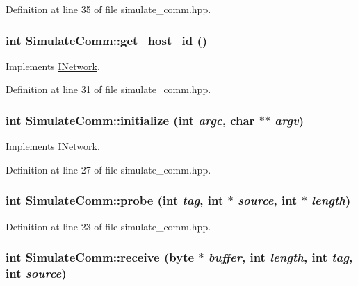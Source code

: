 Definition at line 35 of file simulate\_\-comm.hpp.\hypertarget{class_simulate_comm_a0cc18f43f08d707c300466e9e1a59184}{
\subsubsection[{get\_\-host\_\-id}]{\setlength{\rightskip}{0pt plus 5cm}int SimulateComm::get\_\-host\_\-id ()}}
\label{class_simulate_comm_a0cc18f43f08d707c300466e9e1a59184}


Implements \hyperlink{class_i_network_aef01bb260a8e60c7c9085b381cf86f13}{INetwork}.

Definition at line 31 of file simulate\_\-comm.hpp.\hypertarget{class_simulate_comm_a7086d3778f9c2d01d0425c4d940a57d1}{
\subsubsection[{initialize}]{\setlength{\rightskip}{0pt plus 5cm}int SimulateComm::initialize (int {\em argc}, \/  char $\ast$$\ast$ {\em argv})}}
\label{class_simulate_comm_a7086d3778f9c2d01d0425c4d940a57d1}


Implements \hyperlink{class_i_network_a5c706262a4275f321687a189686a2b81}{INetwork}.

Definition at line 27 of file simulate\_\-comm.hpp.\hypertarget{class_simulate_comm_a3f005f136eac8100b0bf8e7472e55bf3}{
\subsubsection[{probe}]{\setlength{\rightskip}{0pt plus 5cm}int SimulateComm::probe (int {\em tag}, \/  int $\ast$ {\em source}, \/  int $\ast$ {\em length})}}
\label{class_simulate_comm_a3f005f136eac8100b0bf8e7472e55bf3}


Definition at line 23 of file simulate\_\-comm.hpp.\hypertarget{class_simulate_comm_a1c94227cec96dc0f46791675bd556f0a}{
\subsubsection[{receive}]{\setlength{\rightskip}{0pt plus 5cm}int SimulateComm::receive ({\bf byte} $\ast$ {\em buffer}, \/  int {\em length}, \/  int {\em tag}, \/  int {\em source})}}
\label{class_simulate_comm_a1c94227cec96dc0f46791675bd556f0a}



